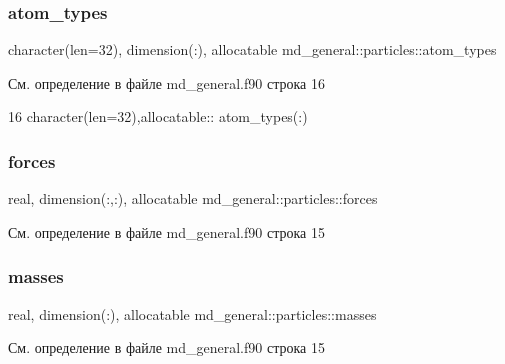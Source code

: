 \subsubsection{\texorpdfstring{atom\+\_\+types}{atom\_types}}
{\footnotesize\ttfamily character(len=32), dimension(\+:), allocatable md\+\_\+general\+::particles\+::atom\+\_\+types}



См. определение в файле md\+\_\+general.\+f90 строка 16


\begin{DoxyCode}
16     \textcolor{keywordtype}{character(len=32)},\textcolor{keywordtype}{allocatable}:: atom\_types(:)
\end{DoxyCode}
\mbox{\label{structmd__general_1_1particles_a87bc129db48217c4312de873a2215616}} 
\subsubsection{\texorpdfstring{forces}{forces}}
{\footnotesize\ttfamily real, dimension(\+:,\+:), allocatable md\+\_\+general\+::particles\+::forces}



См. определение в файле md\+\_\+general.\+f90 строка 15

\mbox{\label{structmd__general_1_1particles_a3f42e69b5affa491731cdd18733b443a}} 
\subsubsection{\texorpdfstring{masses}{masses}}
{\footnotesize\ttfamily real, dimension(\+:), allocatable md\+\_\+general\+::particles\+::masses}



См. определение в файле md\+\_\+general.\+f90 строка 15

\mbox{\label{structmd__general_1_1particles_aeace4d645aa37734b6204936be3d528e}} 
